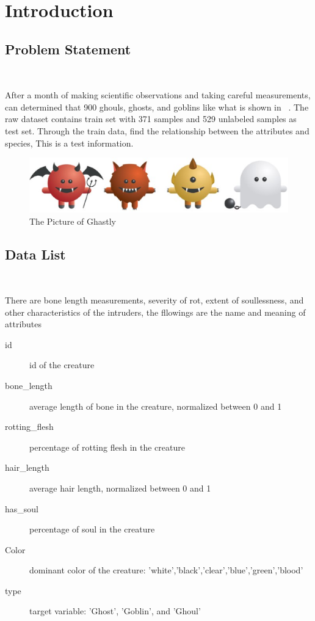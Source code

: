 
\section{Introduction}\label{sec-intro}

\subsection{Problem Statement}
\

After a month of making scientific observations 
and taking careful measurements, 
can determined that 900 ghouls, ghosts, and goblins
like what is shown in~  .
The raw dataset contains train set with 371 
samples and 529 unlabeled samples as test set.
Through the train data, find the relationship
between the attributes and species, 
This is a test information.


\begin{figure}[htbp]
	\centering
	\includegraphics[scale=0.3]{figures/bar.eps}
	\caption{The Picture of Ghastly}\label{fig:animal}
\end{figure}


\subsection{Data List}
\

There are bone length measurements, 
severity of rot, extent of soullessness, 
and other characteristics of the intruders,
the fllowings are the  
name and meaning of attributes


\begin{description}
	\item[id] id of the creature
	\item[bone\_length] average length of bone in the creature, normalized between 0 and 1
	\item[rotting\_flesh] percentage of rotting flesh in the creature
	\item[hair\_length] average hair length, normalized between 0 and 1
	\item[has\_soul] percentage of soul in the creature
	\item[Color] dominant color of the creature: 'white','black','clear','blue','green','blood'
	\item[type] target variable: 'Ghost', 'Goblin', and 'Ghoul'
\end{description}


